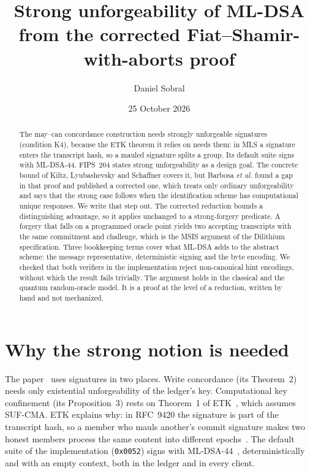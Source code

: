 \documentclass[aps,prx,reprint,superscriptaddress,nofootinbib,floatfix]{revtex4-2}
\theoremstyle{remark}
\begin{document}
\title{Strong unforgeability of ML-DSA\\ from the corrected Fiat--Shamir-with-aborts proof}

\author{Daniel Sobral}

\date{25 October 2026}

\begin{abstract}
The may--can concordance construction needs strongly unforgeable signatures (condition K4), because the ETK theorem it relies on needs them: in MLS a signature enters the transcript hash, so a mauled signature splits a group. Its default suite signs with ML-DSA-44. FIPS~204 states strong unforgeability as a design goal. The concrete bound of Kiltz, Lyubashevsky and Schaffner covers it, but Barbosa \emph{et al.} found a gap in that proof and published a corrected one, which treats only ordinary unforgeability and says that the strong case follows when the identification scheme has computational unique responses. We write that step out. The corrected reduction bounds a distinguishing advantage, so it applies unchanged to a strong-forgery predicate. A forgery that falls on a programmed oracle point yields two accepting transcripts with the same commitment and challenge, which is the MSIS argument of the Dilithium specification. Three bookkeeping terms cover what ML-DSA adds to the abstract scheme: the message representative, deterministic signing and the byte encoding. We checked that both verifiers in the implementation reject non-canonical hint encodings, without which the result fails trivially. The argument holds in the classical and the quantum random-oracle model. It is a proof at the level of a reduction, written by hand and not mechanized.
\end{abstract}

\maketitle

\section{Why the strong notion is needed}

The paper~\cite{concordance} uses signatures in two places. Write concordance (its Theorem~2) needs only existential unforgeability of the ledger's key. Computational key confinement (its Proposition~3) rests on Theorem~1 of ETK~\cite{etk}, which assumes SUF-CMA. ETK explains why: in RFC~9420 the signature is part of the transcript hash, so a member who mauls another's commit signature makes two honest members process the same content into different epochs~\cite[Sec.~5.2]{etk}. The default suite of the implementation (\texttt{0x0052}) signs with ML-DSA-44~\cite{fips204}, deterministically and with an empty context, both in the ledger and in every client.
\end{document}
